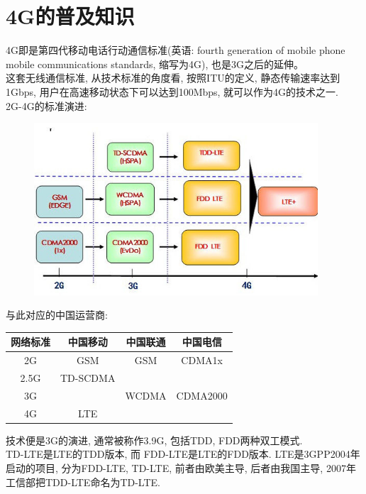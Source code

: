\section {\ZHH 4G的普及知识} {

    { 4G即是第四代移动电话行动通信标准(英语: fourth generation of mobile phone mobile communications standards, 缩写为4G), 也是3G之后的延伸。} \\
    { 这套无线通信标准, 从技术标准的角度看, 按照ITU的定义, 静态传输速率达到1Gbps, 用户在高速移动状态下可以达到100Mbps, 就可以作为4G的技术之一. } \\

    \vspace {6pt}
    { 2G-4G的标准演进: } \\
    \begin {figure} [htbn]
        \centering
        \includegraphics [width = 300pt, keepaspectratio] {4g.jpg}
    \end {figure}

    \vspace {6pt}
    { 与此对应的中国运营商: } \\
    \begin {tabular} {| c | c | c | c |}
        \hline
        网络标准    &   中国移动    &   中国联通    &   中国电信    \\
        \hline
        2G          &   GSM         &   GSM         &   CDMA1x      \\
        \hline
        2.5G        &   TD-SCDMA    &               &               \\
        \hline
        3G          &               &   WCDMA       &   CDMA2000    \\
        \hline
        4G          &   LTE         &               &               \\
        \hline
    \end {tabular}

    \vspace {6pt}
    {  技术便是3G的演进, 通常被称作3.9G, 包括TDD, FDD两种双工模式. } \\
    { TD-LTE是LTE的TDD版本, 而 FDD-LTE是LTE的FDD版本. LTE是3GPP2004年启动的项目, 分为FDD-LTE, TD-LTE, 前者由欧美主导, 后者由我国主导, 2007年工信部把TDD-LTE命名为TD-LTE. } \\
}


